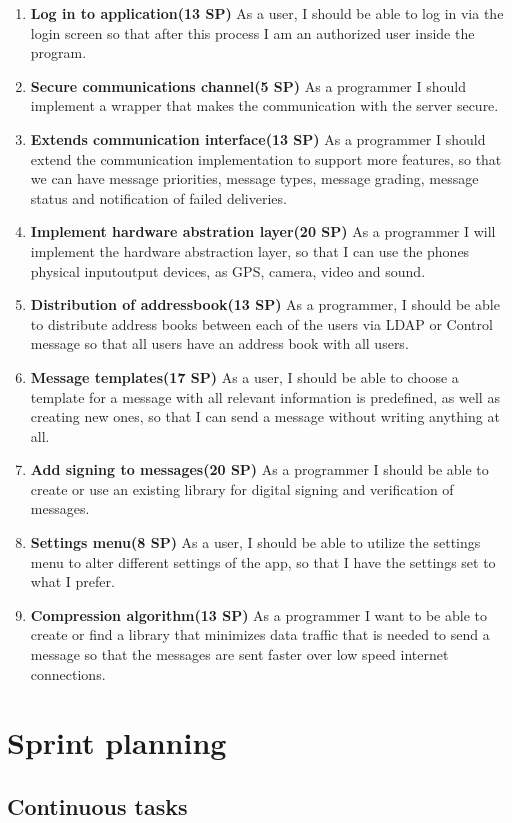 \documentclass[a4paper, norsk, 12pt]{article}
\newcommand{\SP}[1]{(#1 SP)}
\begin{document}
\begin{enumerate}
			\item {\bf Log in to application\SP{13}} As a user, I should be able to log in via the login screen so that after this process I am an authorized user inside the program.
			\item {\bf Secure communications channel\SP{5}} As a programmer I should implement a wrapper that makes the communication with the server secure.
			\item {\bf Extends communication interface\SP{13}} As a programmer I should extend the communication implementation to support more features, so that we can have message priorities, message types, message grading, message status and notification of failed deliveries.
			\item {\bf Implement hardware abstration layer\SP{20}} As a programmer I will implement the hardware abstraction layer, so that I can use the phones physical input\/output devices, as GPS, camera, video and sound. 
			\item {\bf Distribution of addressbook\SP{13}} As a programmer, I should be able to distribute address books between each of the users via LDAP or Control message so that all users have an address book with all users.
			\item {\bf Message templates\SP{17}} As a user, I should be able to choose a template for a message with all relevant information is predefined, as well as creating new ones, so that I can send a message without writing anything at all.
			\item {\bf Add signing to messages\SP{20}} As a programmer I should be able to create or use an existing library for digital signing and verification of messages.
			\item {\bf Settings menu\SP{8}} As a user, I should be able to utilize the settings menu to alter different settings of the app, so that I have the settings set to what I prefer.
			\item {\bf Compression algorithm\SP{13}} As a programmer I want to be able to create or find a library that minimizes data traffic that is needed to send a message so that the messages are sent faster over low speed internet connections.	
		\end{enumerate}
	\pagebreak
	\section{Sprint planning}
	\subsection{Continuous tasks}
\end{document}
